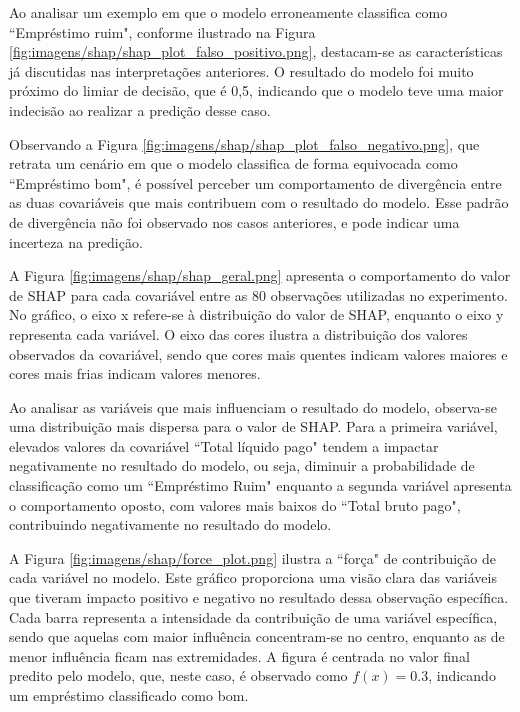 

Ao analisar um exemplo em que o modelo erroneamente classifica como ``Empréstimo ruim", conforme ilustrado na Figura
 \ref{fig:imagens/shap/shap_plot_falso_positivo.png}, destacam-se as características já discutidas nas interpretações
  anteriores. O resultado do modelo foi muito próximo do limiar de decisão, que é 0,5, indicando que o modelo teve 
  uma maior indecisão ao realizar a predição desse caso.



Observando a Figura \ref{fig:imagens/shap/shap_plot_falso_negativo.png}, que retrata um cenário em que o modelo
 classifica de forma equivocada como ``Empréstimo bom", é possível perceber um comportamento de divergência entre 
 as  duas covariáveis que mais contribuem com o resultado do modelo. Esse padrão de divergência não foi observado nos
  casos anteriores, e pode indicar uma incerteza na predição.




A Figura \ref{fig:imagens/shap/shap_geral.png} apresenta o comportamento do valor de SHAP para cada covariável
entre as 80 observações utilizadas no experimento. No gráfico, o eixo x refere-se à distribuição do valor de SHAP,
enquanto o eixo y representa cada variável. O eixo das cores ilustra a distribuição dos valores observados da covariável, 
sendo que cores mais quentes indicam valores maiores e cores mais frias indicam valores menores.

Ao analisar as variáveis que mais influenciam o resultado do modelo, observa-se uma distribuição mais dispersa para o valor de SHAP.
 Para a primeira variável, elevados valores da covariável ``Total líquido pago" tendem a impactar negativamente no resultado do modelo,
 ou seja, diminuir a probabilidade de classificação como um ``Empréstimo Ruim"
 enquanto a segunda variável apresenta o comportamento oposto, com valores mais baixos do ``Total bruto pago",
  contribuindo negativamente no
  resultado do modelo.




A Figura \ref{fig:imagens/shap/force_plot.png} ilustra a ``força" de contribuição de cada variável no modelo.
 Este gráfico proporciona uma visão clara das variáveis que tiveram impacto positivo e negativo no resultado dessa observação 
 específica.
  Cada barra representa a intensidade da contribuição de uma variável específica, sendo que aquelas com maior 
  influência concentram-se no centro, enquanto as de menor influência ficam nas extremidades. 
  A figura é centrada no valor final predito pelo modelo, que, neste caso, é observado como $f(x) = 0.3$, 
  indicando um empréstimo classificado como bom.


